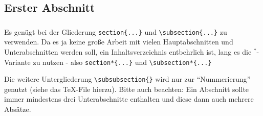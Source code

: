 \thispagestyle{empty}
\begin{abstract}
Hier sollte eine eine kurze Zusammenfassung des Inhalts des Vortrags oder der Hausarbeit stehen.
Dazu dieses \TeX{}-File kopieren und umbenennen.
Weitergehende Literatur ist im  Literatur\-verzeichnis aufgeführt, wobei ich das Buch von \textsc{Voss} \cite{voss-wiss} empfehlen kann.
Für einen Einstieg empfehle ich \emph{l2kurz.pdf}, das man auf 
%
\begin{center}
\texttt{http://mirror.ctan.org/info/lshort/german/} 
\end{center}
%
findet.
Dieses ist als Kurzeinführung gut geeignet, verwendet aber die üblichen Dokumentklassen von \LaTeX{} und nicht die besser geeigneten von `KOMA-Script`.
Weiteres in meinem Erläuterungen \emph{Sem-ReadMe.md}.
Ein Teil der hier angegeben Literatur und weiteres findet sich auf ILIAS \bzw in dem \og PDF.
\end{abstract}
%
\subsection{Erster Abschnitt}\label{sec:erster-abschnitt}
\subsubsection{}
Es genügt bei der Gliederung \verb|section{...}| und \verb|\subsection{...}| zu verwenden.
Da es ja keine große Arbeit mit vielen Hauptabschnitten und Unterabschnitten werden soll, \dh ein Inhaltsverzeichnis entbehrlich ist, lang es die  $ ^{*} $-Variante zu nutzen - also \verb|section*{...}| und \verb|\subsection*{...}|

Die weitere Untergliederung \verb|\subsubsection{}| wird nur zur \enquote{Nummerierung} genutzt (siehe das \TeX{}-File hierzu).
Bitte auch beachten: Ein Abschnitt sollte immer mindestens drei Unterabschnitte enthalten und diese dann auch mehrere Absätze. 

